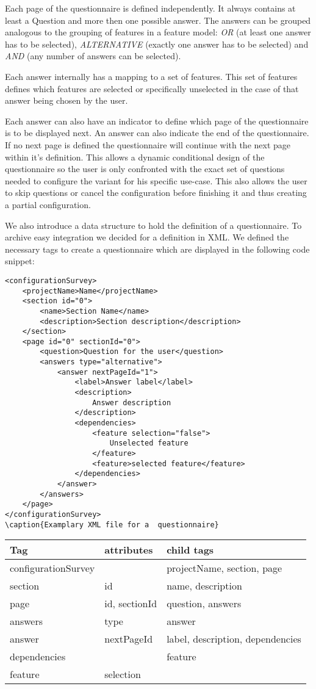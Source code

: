 Each page of the questionnaire is defined independently. It always contains at least a Question and more then one possible answer. The answers can be grouped analogous to the grouping of features in a feature model: \textit{OR} (at least one answer has to be selected), \textit{ALTERNATIVE} (exactly one answer has to be selected) and \textit{AND} (any number of answers can be selected).

Each answer internally has a mapping to a set of features. This set of features defines which features are selected or specifically unselected in the case of that answer being chosen by the user.

Each answer can also have an indicator to define which page of the questionnaire is to be displayed next. An answer can also indicate the end of the questionnaire. If no next page is defined the questionnaire will continue with the next page within it's definition. This allows a dynamic conditional design of the questionnaire so the user is only confronted with the exact set of questions needed to configure the variant for his specific use-case. This also allows the user to skip questions or cancel the configuration before finishing it and thus creating a partial configuration.

We also introduce a data structure to hold the definition of a questionnaire. To archive easy integration we decided for a definition in XML. We defined the necessary tags to create a questionnaire which are displayed in the following code snippet:

\begin{lstlisting}
<configurationSurvey>
	<projectName>Name</projectName>
	<section id="0">
		<name>Section Name</name>
		<description>Section description</description>
	</section>
	<page id="0" sectionId="0">
		<question>Question for the user</question>
		<answers type="alternative">
			<answer nextPageId="1">
				<label>Answer label</label>
				<description>
					Answer description
				</description>
				<dependencies>
					<feature selection="false">
						Unselected feature
					</feature>
					<feature>selected feature</feature>
				</dependencies>
			</answer>
		</answers>
	</page>
</configurationSurvey>
\caption{Examplary XML file for a  questionnaire}
\end{lstlisting}

\begin{tabulary}{\linewidth}{LLL}
\textbf{Tag} & \textbf{attributes} & \textbf{child tags}\\
\hline
configurationSurvey & & projectName, section, page\\
section & id & name, description\\
page & id, sectionId & question, answers\\
answers & type & answer\\
answer & nextPageId & label, description, dependencies\\
dependencies & & feature\\
feature & selection & \\
\end{tabulary}\vspace{2.5em}

